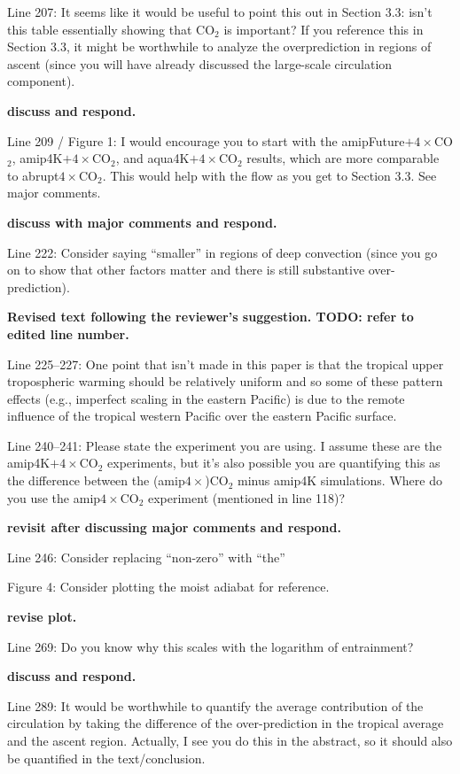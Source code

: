 \documentclass[11pt]{article}
\begin{document}
Line 207: It seems like it would be useful to point this out in Section 3.3: isn't this table essentially showing that CO\(_2\) is important? If you reference this in Section 3.3, it might be worthwhile to analyze the overprediction in regions of ascent (since you will have already discussed the large-scale circulation component).

\textbf{discuss and respond.}

Line 209 / Figure 1: I would encourage you to start with the amipFuture\(+4\times\)CO\(_2\), amip4K\(+4\times\)CO\(_2\), and aqua4K\(+4\times\)CO\(_2\) results, which are more comparable to abrupt\(4\times\)CO\(_2\). This would help with the flow as you get to Section 3.3. See major comments.

\textbf{discuss with major comments and respond.}

Line 222: Consider saying ``smaller'' in regions of deep convection (since you go on to show that other factors matter and there is still substantive over-prediction).

\textbf{Revised text following the reviewer's suggestion. TODO: refer to edited line number.}

Line 225--227: One point that isn't made in this paper is that the tropical upper tropospheric warming should be relatively uniform and so some of these pattern effects (e.g., imperfect scaling in the eastern Pacific) is due to the remote influence of the tropical western Pacific over the eastern Pacific surface.

Line 240--241: Please state the experiment you are using. I assume these are the amip4K\(+4\times\)CO\(_2\) experiments, but it's also possible you are quantifying this as the difference between the (amip\(4\times\))CO\(_2\) minus amip4K simulations. Where do you use the amip\(4\times\)CO\(_2\) experiment (mentioned in line 118)?

\textbf{revisit after discussing major comments and respond.}

Line 246: Consider replacing ``non-zero'' with ``the''

Figure 4: Consider plotting the moist adiabat for reference.

\textbf{revise plot.}

Line 269: Do you know why this scales with the logarithm of entrainment?

\textbf{discuss and respond.}

Line 289: It would be worthwhile to quantify the average contribution of the circulation by taking the difference of the over-prediction in the tropical average and the ascent region. Actually, I see you do this in the abstract, so it should also be quantified in the text/conclusion.
\end{document}

